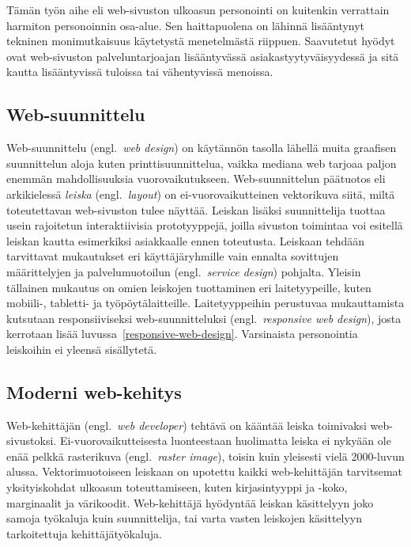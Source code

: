 \documentclass[finnish, 12pt, a4paper, elec, utf8, a-1b, online]{aaltothesis}
\begin{document}
Tämän työn aihe eli web-sivuston ulkoasun personointi on kuitenkin verrattain
harmiton personoinnin osa-alue. Sen haittapuolena on lähinnä lisääntynyt
tekninen monimutkaisuus käytetystä menetelmästä riippuen. Saavutetut hyödyt ovat
web-sivuston palveluntarjoajan lisääntyvässä asiakastyytyväisyydessä ja sitä
kautta lisääntyvissä tuloissa tai vähentyvissä menoissa.

\subsection{Web-suunnittelu}

Web-suunnittelu (engl.\ \textit{web design}) on käytännön tasolla lähellä muita
graafisen suunnittelun aloja kuten printtisuunnittelua, vaikka mediana web
tarjoaa paljon enemmän mahdollisuuksia vuorovaikutukseen. Web-suunnittelun
päätuotos eli arkikielessä \textit{leiska} (engl.\ \textit{layout}) on
ei-vuorovaikutteinen vektorikuva siitä, miltä toteutettavan web-sivuston tulee
näyttää. Leiskan lisäksi suunnittelija tuottaa usein rajoitetun interaktiivisia
prototyyppejä, joilla sivuston toimintaa voi esitellä leiskan kautta esimerkiksi
asiakkaalle ennen toteutusta. Leiskaan tehdään tarvittavat mukautukset eri
käyttäjäryhmille vain ennalta sovittujen määrittelyjen ja palvelumuotoilun
(engl.\ \textit{service design}) pohjalta. Yleisin tällainen mukautus on omien
leiskojen tuottaminen eri laitetyypeille, kuten mobiili-, tabletti- ja
työpöytälaitteille. Laitetyyppeihin perustuvaa mukauttamista kutsutaan
responsiiviseksi web-suunnitteluksi (engl.\ \textit{responsive web design}),
josta kerrotaan lisää luvussa~\ref{responsive-web-design}. Varsinaista
personointia leiskoihin ei yleensä sisällytetä.

\subsection{Moderni web-kehitys}

Web-kehittäjän (engl.\ \textit{web developer}) tehtävä on kääntää
leiska toimivaksi web-sivustoksi. Ei-vuorovaikutteisesta luonteestaan
huolimatta leiska ei nykyään ole enää pelkkä rasterikuva (engl.\ \textit{raster
image}), toisin kuin yleisesti vielä 2000-luvun alussa. Vektorimuotoiseen
leiskaan on upotettu kaikki web-kehittäjän tarvitsemat yksityiskohdat
ulkoasun toteuttamiseen, kuten kirjasintyyppi ja -koko, marginaalit ja
värikoodit. Web-kehittäjä hyödyntää leiskan käsittelyyn joko samoja
työkaluja kuin suunnittelija, tai varta vasten leiskojen käsittelyyn
tarkoitettuja kehittäjätyökaluja.
\end{document}
